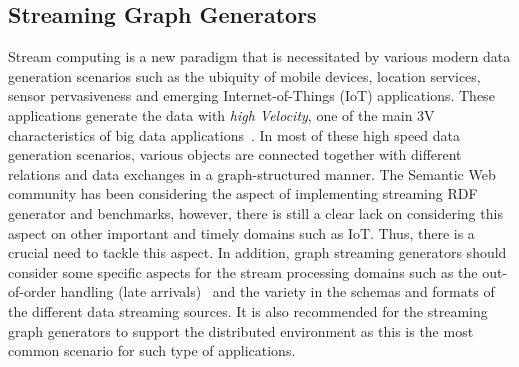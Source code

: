 \subsection{Streaming Graph Generators}
Stream computing is a new paradigm that is necessitated by various modern data generation scenarios such as the ubiquity of mobile devices, location services,
sensor pervasiveness and emerging Internet-of-Things (IoT) applications. These applications generate the data with \emph{high Velocity}, one of the main 3V characteristics of big data applications~\cite{sakr2016big}. In most of these high speed data generation scenarios, various objects are connected together with different relations and data exchanges  in a graph-structured manner. The Semantic Web community has been considering the aspect of implementing streaming RDF generator and benchmarks, however, there is still a clear lack on considering this aspect on other important and timely domains such as IoT. Thus, there is a crucial need to tackle this aspect. In addition, graph streaming generators should  consider some specific aspects for the stream processing domains such as the out-of-order handling (late arrivals)~\cite{li2008out} and the variety in the schemas and formats of the different data streaming sources. It is also recommended for the streaming graph generators to support the distributed environment as this is the most common scenario for such type of applications.
